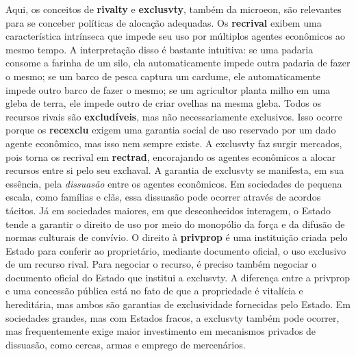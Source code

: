 \documentclass[./main.tex]{subfiles}
\begin{document}
\par Aqui, os conceitos de \textbf{\gls{rivalty}} e \textbf{\gls{exclusvty}}, também da \gls{microeon}, são relevantes para se conceber políticas de alocação adequadas. Os \textbf{\gls{recrival}} exibem uma característica intrínseca que impede seu uso por múltiplos agentes econômicos ao mesmo tempo. A interpretação disso é bastante intuitiva: se uma padaria consome a farinha de um silo, ela automaticamente impede outra padaria de fazer o mesmo; se um barco de pesca captura um cardume, ele automaticamente impede outro barco de fazer o mesmo; se um agricultor planta milho em uma gleba de terra, ele impede outro de criar ovelhas na mesma gleba. Todos os recursos rivais são \textbf{excludíveis}, mas não necessariamente exclusivos. Isso ocorre porque os \textbf{\gls{recexclu}} exigem uma garantia social de uso reservado por um dado agente econômico, mas isso nem sempre existe. A \gls{exclusvty} faz surgir mercados, pois torna os \gls{recrival} em \textbf{\gls{rectrad}}, encorajando os agentes econômicos a alocar recursos entre si pelo seu \gls{exchaval}. A garantia de \gls{exclusvty} se manifesta, em sua essência, pela \textit{dissuasão} entre os agentes econômicos. Em sociedades de pequena escala, como famílias e clãs, essa dissuasão pode ocorrer através de acordos tácitos. Já em sociedades maiores, em que desconhecidos interagem, o Estado tende a garantir o direito de uso por meio do monopólio da força e da difusão de normas culturais de convívio. O direito à \textbf{\gls{privprop}} é uma instituição criada pelo Estado para conferir ao proprietário, mediante documento oficial, o uso exclusivo de um recurso rival. Para negociar o recurso, é preciso também negociar o documento oficial do Estado que institui a \gls{exclusvty}. A diferença entre a \gls{privprop} e uma concessão pública está no fato de que a propriedade é vitalícia e hereditária, mas ambos são garantias de exclusividade fornecidas pelo Estado. Em sociedades grandes, mas com Estados fracos, a \gls{exclusvty} também pode ocorrer, mas frequentemente exige maior investimento em mecanismos privados de dissuasão, como cercas, armas e emprego de mercenários.
\end{document}
